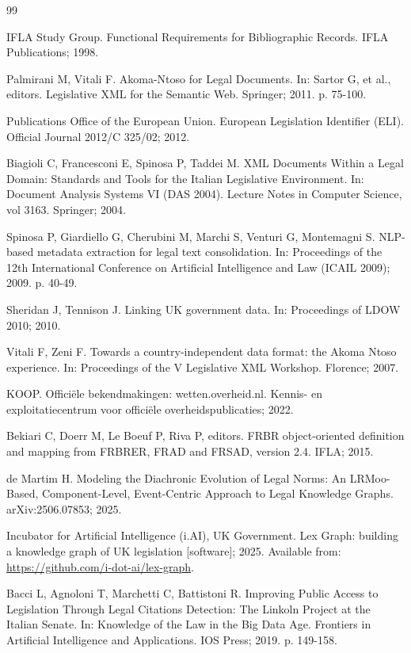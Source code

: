 \documentclass{IOS-Book-Article}
\begin{document}
\begin{thebibliography}{99}

IFLA Study Group. Functional Requirements for Bibliographic Records. IFLA Publications; 1998.

Palmirani M, Vitali F. Akoma-Ntoso for Legal Documents. In: Sartor G, et al., editors.
Legislative XML for the Semantic Web. Springer; 2011. p. 75-100.

Publications Office of the European Union. European Legislation Identifier (ELI). Official
Journal 2012/C 325/02; 2012.

Biagioli C, Francesconi E, Spinosa P, Taddei M. XML Documents Within a Legal Domain:
Standards and Tools for the Italian Legislative Environment. In: Document Analysis Systems
VI (DAS 2004). Lecture Notes in Computer Science, vol 3163. Springer; 2004.

Spinosa P, Giardiello G, Cherubini M, Marchi S, Venturi G, Montemagni S. NLP-based metadata
extraction for legal text consolidation. In: Proceedings of the 12th International Conference
on Artificial Intelligence and Law (ICAIL 2009); 2009. p. 40-49.

Sheridan J, Tennison J. Linking UK government data. In: Proceedings of LDOW 2010; 2010.

Vitali F, Zeni F. Towards a country-independent data format: the Akoma Ntoso experience. In:
Proceedings of the V Legislative XML Workshop. Florence; 2007.

KOOP. Offici\"{e}le bekendmakingen: wetten.overheid.nl. Kennis- en exploitatiecentrum voor
offici\"{e}le overheidspublicaties; 2022.

Bekiari C, Doerr M, Le Boeuf P, Riva P, editors. FRBR object-oriented definition and
mapping from FRBRER, FRAD and FRSAD, version 2.4. IFLA; 2015.

de Martim H. Modeling the Diachronic Evolution of Legal Norms: An LRMoo-Based,
Component-Level, Event-Centric Approach to Legal Knowledge Graphs. arXiv:2506.07853; 2025.

Incubator for Artificial Intelligence (i.AI), UK Government. Lex Graph: building a knowledge
graph of UK legislation [software]; 2025. Available from:
\url{https://github.com/i-dot-ai/lex-graph}.

Bacci L, Agnoloni T, Marchetti C, Battistoni R. Improving Public Access to Legislation
Through Legal Citations Detection: The Linkoln Project at the Italian Senate. In: Knowledge
of the Law in the Big Data Age. Frontiers in Artificial Intelligence and Applications.
IOS Press; 2019. p. 149-158.


\end{thebibliography}
\end{document}
